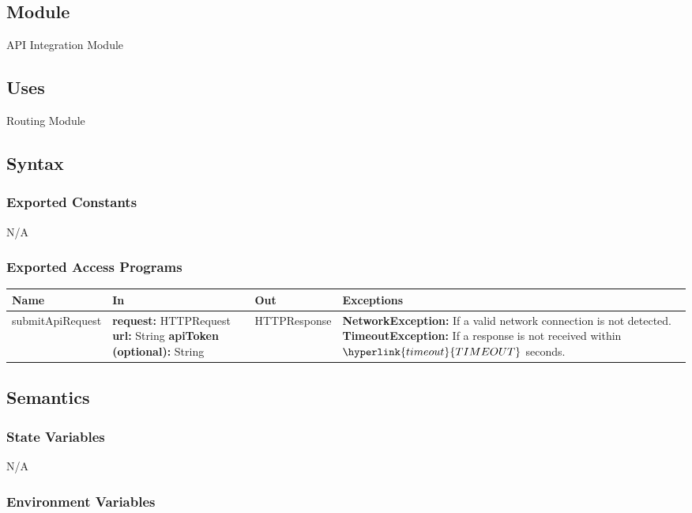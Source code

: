 \documentclass[12pt, titlepage]{article}
\begin{document}
\subsection{Module}
API Integration Module
\subsection{Uses}
Routing Module
\subsection{Syntax}

\subsubsection{Exported Constants}
N/A

\subsubsection{Exported Access Programs}

\begin{center}
  \begin{tabular}{>{\raggedright}p{3cm} >{\raggedright}p{5cm}
    >{\raggedright}p{4cm} p{4cm}}
    \hline
    \textbf{Name} & \textbf{In} & \textbf{Out} & \textbf{Exceptions} \\
    \hline
    submitApiRequest & \textbf{request:} HTTPRequest
    \newline \textbf{url:} String \newline \textbf{apiToken
    (optional):} String & HTTPResponse &
    \textbf{NetworkException:} If a valid network connection is not detected.
    \newline \textbf{TimeoutException:} If a response is not received within
    $\hyperlink{timeout}{TIMEOUT}$ seconds.\\
    \hline
  \end{tabular}
\end{center}

\subsection{Semantics}

\subsubsection{State Variables}
N/A

\subsubsection{Environment Variables}
\end{document}
